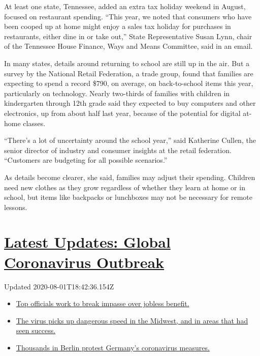 At least one state, Tennessee, added an extra tax holiday weekend in
August, focused on restaurant spending. ``This year, we noted that
consumers who have been cooped up at home might enjoy a sales tax
holiday for purchases in restaurants, either dine in or take out,''
State Representative Susan Lynn, chair of the Tennessee House Finance,
Ways and Means Committee, said in an email.

In many states, details around returning to school are still up in the
air. But a survey by the National Retail Federation, a trade group,
found that families are expecting to spend a record \$790, on average,
on back-to-school items this year, particularly on technology. Nearly
two-thirds of families with children in kindergarten through 12th grade
said they expected to buy computers and other electronics, up from about
half last year, because of the potential for digital at-home classes.

``There's a lot of uncertainty around the school year,'' said Katherine
Cullen, the senior director of industry and consumer insights at the
retail federation. ``Customers are budgeting for all possible
scenarios.''

As details become clearer, she said, families may adjust their spending.
Children need new clothes as they grow regardless of whether they learn
at home or in school, but items like backpacks or lunchboxes may not be
necessary for remote lessons.

\hypertarget{latest-updates-global-coronavirus-outbreak}{%
\section{\texorpdfstring{\href{https://www.nytimes.com/2020/08/01/world/coronavirus-covid-19.html?action=click\&pgtype=Article\&state=default\&region=MAIN_CONTENT_1\&context=storylines_live_updates}{Latest
Updates: Global Coronavirus
Outbreak}}{Latest Updates: Global Coronavirus Outbreak}}\label{latest-updates-global-coronavirus-outbreak}}

Updated 2020-08-01T18:42:36.154Z

\begin{itemize}
\tightlist
\item
  \href{https://www.nytimes.com/2020/08/01/world/coronavirus-covid-19.html?action=click\&pgtype=Article\&state=default\&region=MAIN_CONTENT_1\&context=storylines_live_updates\#link-3ac56579}{Top
  officials work to break impasse over jobless benefit.}
\item
  \href{https://www.nytimes.com/2020/08/01/world/coronavirus-covid-19.html?action=click\&pgtype=Article\&state=default\&region=MAIN_CONTENT_1\&context=storylines_live_updates\#link-8796723}{The
  virus picks up dangerous speed in the Midwest, and in areas that had
  seen success.}
\item
  \href{https://www.nytimes.com/2020/08/01/world/coronavirus-covid-19.html?action=click\&pgtype=Article\&state=default\&region=MAIN_CONTENT_1\&context=storylines_live_updates\#link-25930521}{Thousands
  in Berlin protest Germany's coronavirus measures.}
\end{itemize}

